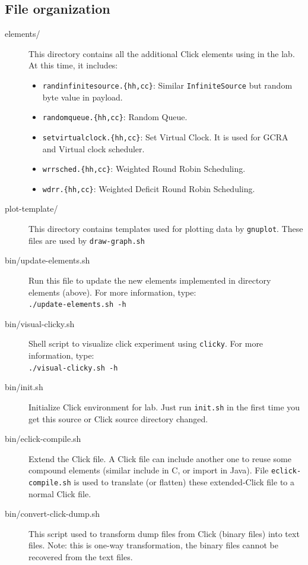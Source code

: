 \documentclass[a4paper]{article}
\begin{document}
    \subsection{File organization}
      \begin{description}
      	\item[elements/] This directory contains all the additional Click elements using in the lab. At this time, it includes:
      	\begin{itemize}
      		\item \texttt{randinfinitesource.\{hh,cc\}}: Similar \texttt{InfiniteSource} but random byte value in payload.
      		\item \texttt{randomqueue.\{hh,cc\}}: Random Queue.
      		\item \texttt{setvirtualclock.\{hh,cc\}}: Set Virtual Clock. It is used for GCRA and Virtual clock scheduler.
      		\item \texttt{wrrsched.\{hh,cc\}}: Weighted Round Robin Scheduling.
      		\item \texttt{wdrr.\{hh,cc\}}: Weighted Deficit Round Robin Scheduling.
      	\end{itemize}
      	\item[plot-template/] This directory contains templates used for plotting data by \texttt{gnuplot}. These files are used by \texttt{draw-graph.sh}
      	\item[bin/update-elements.sh] Run this file to update the new elements implemented in directory elements (above). For more information, type: \\
      	\texttt{./update-elements.sh -h}
      	\item[bin/visual-clicky.sh]Shell script to visualize click experiment using \texttt{clicky}. For more information, type: \\ 
      	\texttt{./visual-clicky.sh -h}
      	\item[bin/init.sh]Initialize Click environment for lab. Just run \texttt{init.sh} in the first time you get this source or Click source directory changed.
      	\item[bin/eclick-compile.sh] Extend the Click file. A Click file can include another one to reuse some compound elements (similar include in C, or import in Java). File \texttt{eclick-compile.sh} is used to translate (or flatten) these extended-Click file to a normal Click file.
      	\item[bin/convert-click-dump.sh]This script used to transform dump files from Click (binary files) into text files. Note: this is one-way transformation, the binary files cannot be recovered from the text files.

\end{description}
\end{document}
